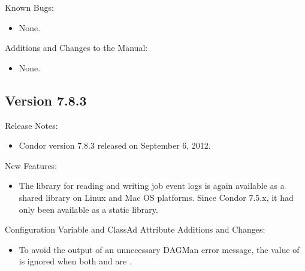 \noindent Known Bugs:

\begin{itemize}

\item None.

\end{itemize}

\noindent Additions and Changes to the Manual:

\begin{itemize}

\item None.

\end{itemize}


\subsection*{\label{sec:New-7-8-3}Version 7.8.3}

\noindent Release Notes:

\begin{itemize}

\item Condor version 7.8.3 released on September 6, 2012.

\end{itemize}


\noindent New Features:

\begin{itemize}

\item The  library for reading and writing job event
logs is again available as a shared library on Linux and Mac OS platforms.
Since Condor 7.5.x, it had only been available as a static library.

\end{itemize}

\noindent Configuration Variable and ClassAd Attribute Additions and Changes:

\begin{itemize}

\item To avoid the output of an unnecessary DAGMan error message,
the value of 
is ignored when both 
and  are .

\end{itemize}

